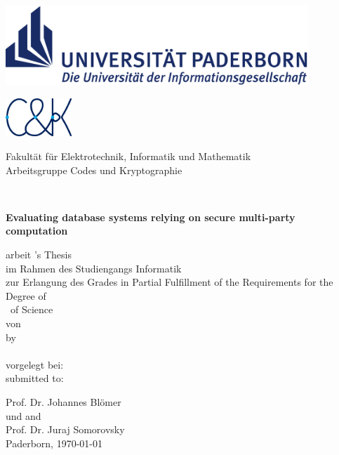 \thispagestyle{empty}
\begin{titlepage}
\begin{center}

	\begin{minipage}{14cm}
		\hspace*{1.9cm}
		\includegraphics[height=3cm]{figures/upb_logo}\\
		\hspace*{1.15cm}
		\begin{minipage}{2.8cm}
			\includegraphics[width=2.5cm]{figures/cuk_logo_2019}
		\end{minipage}
		\begin{minipage}{9.8cm}
			\vspace*{5pt}
			\textsf{%
			Fakultät für Elektrotechnik, Informatik und Mathematik \\
			Arbeitsgruppe Codes und Kryptographie
			}
		\end{minipage}
	\end{minipage}\\[60pt]

	\begin{doublespace}
		{\Huge\textbf{Evaluating database systems relying on secure multi-party computation }}\\[30pt]
	\end{doublespace}

	{\Large
		\ifgerman
			\Degree arbeit
		\else
			\Degree 's Thesis
		\fi
	}\\[6pt]
		\ifgerman
			im Rahmen des Studiengangs Informatik\\
			zur Erlangung des Grades
		\else
			in Partial Fulfillment of the Requirements for the\\
			Degree of
		\fi
		\\[6pt]
  	{\Large \Degree\ of Science}\\[54pt] %

	\ifgerman
		von\\
	\else
		by\\
	\fi
	{\scshape\large \Author}\\[54pt]

	\ifgerman
		vorgelegt bei:\\
	\else
		submitted to:\\
	\fi

	{\large Prof. Dr. Johannes Blömer \\
	\ifgerman
		und
	\else
		and
	\fi
	\\[6pt]
	\large Prof. Dr. Juraj Somorovsky  }\\[25pt]

	{Paderborn, \today}

\end{center}
\end{titlepage}
\clearpage
